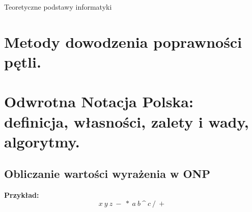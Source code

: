 \documentclass[12pt]{article}
\begin{document}
    \newpage

    \begin{center}
    {\LARGE Teoretyczne podstawy informatyki}
    \end{center}

    \section{Metody dowodzenia poprawności pętli.}
    \section{Odwrotna Notacja Polska: definicja, własności, zalety i wady, algorytmy.}

    \subsection{Obliczanie wartości wyrażenia w ONP}
    \textbf{Przykład:}
    \[x ~ y ~ z ~ - ~ * ~ a ~ b ~ \text{\textasciicircum} ~ c ~ / ~ +\]
\end{document}
